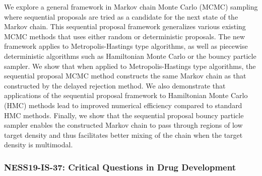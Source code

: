\begin{itemize}
We explore a general framework in Markov chain Monte Carlo (MCMC) sampling where sequential proposals are tried as a candidate for the next state of the Markov chain. This sequential proposal framework generalizes various existing MCMC methods that uses either random or deterministic proposals. The new framework applies to Metropolis-Hastings type algorithms, as well as piecewise deterministic algorithms such as Hamiltonian Monte Carlo or the bouncy particle sampler. We show that when applied to Metropolis-Hastings type algorithms, the sequential proposal MCMC method constructs the same Markov chain as that constructed by the delayed rejection method. We also demonstrate that applications of the sequential proposal framework to Hamiltonian Monte Carlo (HMC) methods lead to improved numerical efficiency compared to standard HMC methods. Finally, we show that the sequential proposal bouncy particle sampler enables the constructed Markov chain to pass through regions of low target density and thus facilitates better mixing of the chain when the target density is multimodal.

\end{itemize}

\subsubsection*{NESS19-IS-37: Critical Questions in Drug Development}

